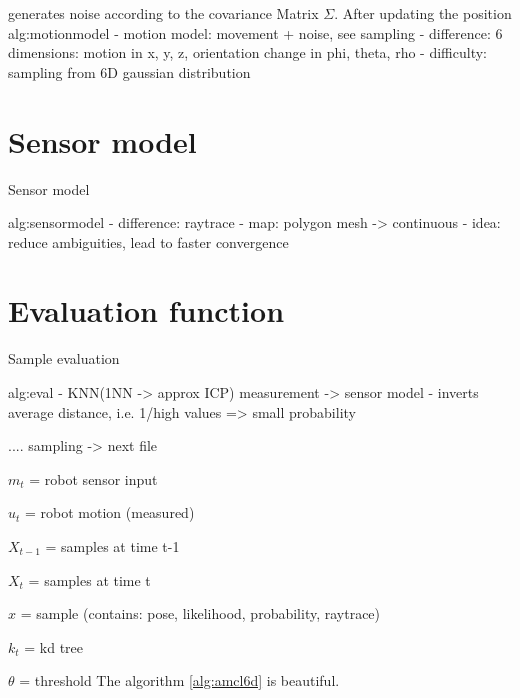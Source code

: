 \documentclass[Thesis.tex]{subfiles}
\begin{document}
generates noise according to the covariance Matrix $\Sigma$. After updating the position 
alg:motionmodel
- motion model: movement + noise, see sampling
- difference: 6 dimensions: motion in x, y, z, orientation change in phi, theta, rho
- difficulty: sampling from 6D gaussian distribution

\section{Sensor model}
\begin{algorithm}
\caption{Sensor model}
\label{alg:sensormodel}

\end{algorithm}
alg:sensormodel
- difference: raytrace
- map: polygon mesh -> continuous
- idea: reduce ambiguities, lead to faster convergence


\section{Evaluation function}
\begin{algorithm}
\caption{Sample evaluation}
\label{alg:eval}

\ev{}{
}
\end{algorithm}

alg:eval
- KNN(1NN -> approx ICP) measurement -> sensor model
- inverts average distance, i.e. 1/high values => small probability

.... sampling -> next file

$m_{t}$ = robot sensor input

$u_{t}$ = robot motion (measured)

$X_{t-1}$ = samples at time t-1

$X_{t}$ = samples at time t

$x$ = sample (contains: pose, likelihood, probability, raytrace)

$k_{t}$ = kd tree

$\theta$ = threshold
The algorithm \ref{alg:amcl6d} is beautiful.
\end{document}
